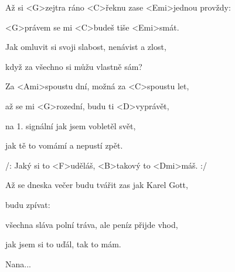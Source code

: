

\zs
Až si <G>zejtra ráno <C>řeknu zase
<Emi>jednou provždy: 

<G>právem se mi <C>budeš tiše <Emi>smát.

Jak omluvit si svoji slabost, nenávist a zlost,

když za všechno si můžu vlastně sám?
\ks

\zr
Za <Ami>spoustu dní, možná za <C>spoustu let,

až se mi <G>rozední, budu ti <D>vyprávět,

na 1. signální jak jsem vobletěl svět,

jak tě to vomámí a nepustí zpět.

/: Jaký si to <F>uděláš, <B>takový to <Dmi>máš. :/
\kr

\zs
Až se dneska večer budu tvářit zas jak Karel Gott,

budu zpívat: 

všechna sláva polní tráva, ale peníz přijde vhod,

jak jsem si to uďál, tak to mám.
\ks

\zr \kr

Nana...

\kp






